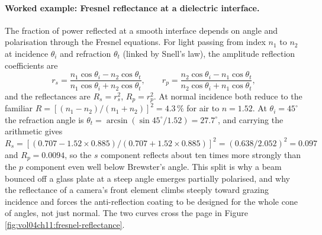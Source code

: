 

\paragraph{Worked example: Fresnel reflectance at a dielectric interface.} The
fraction of power reflected at a smooth interface depends on angle and
polarisation through the Fresnel equations. For light passing from index $n_1$
to $n_2$ at incidence $\theta_i$ and refraction $\theta_t$ (linked by Snell's
law), the amplitude reflection coefficients are
\[
r_s = \frac{n_1\cos\theta_i - n_2\cos\theta_t}
{n_1\cos\theta_i + n_2\cos\theta_t},
\qquad
r_p = \frac{n_2\cos\theta_i - n_1\cos\theta_t}
{n_2\cos\theta_i + n_1\cos\theta_t},
\]
and the reflectances are $R_s = r_s^2$, $R_p = r_p^2$. At normal incidence both
reduce to the familiar $R = [(n_1 - n_2)/(n_1 + n_2)]^2 = 4.3\,\%$ for air to
$n = 1.52$. At $\theta_i = 45^{\circ}$ the refraction angle is
$\theta_t = \arcsin(\sin 45^{\circ}/1.52) = 27.7^{\circ}$, and carrying the
arithmetic gives $R_s = [(0.707 - 1.52\times 0.885)/(0.707 + 1.52\times 0.885)]^2
= (0.638/2.052)^2 = 0.097$ and $R_p = 0.0094$, so the $s$ component reflects
about ten times more strongly than the $p$ component even well below Brewster's
angle. This split is why a beam bounced off a glass plate at a steep angle
emerges partially polarised, and why the reflectance of a camera's front element
climbs steeply toward grazing incidence and forces the anti-reflection coating
to be designed for the whole cone of angles, not just normal. The two curves
cross the page in Figure \ref{fig:vol04ch11:fresnel-reflectance}.

